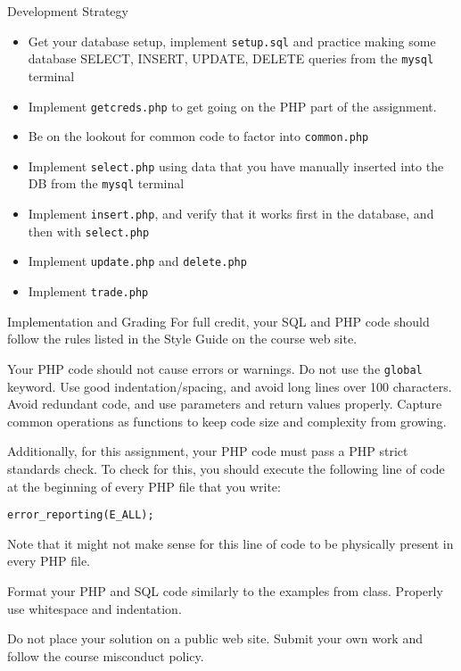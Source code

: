 \documentclass[programming]{../../../../mfcs}
\begin{document}
\begin{question}{Development Strategy}
     \begin{itemize}
       \item Get your database setup, implement \texttt{setup.sql} and practice making some database SELECT, INSERT, UPDATE, DELETE queries from the \texttt{mysql} terminal
       \item Implement \texttt{getcreds.php} to get going on the PHP part of the assignment.
       \item Be on the lookout for common code to factor into \texttt{common.php}
       \item Implement \texttt{select.php} using data that you have manually inserted into the DB from the \texttt{mysql} terminal
       \item Implement \texttt{insert.php}, and verify that it works first in the database, and then with \texttt{select.php}
       \item Implement \texttt{update.php} and \texttt{delete.php}
       \item Implement \texttt{trade.php}
     \end{itemize}
\end{question}


\begin{question}{Implementation and Grading}
For full credit, your SQL and PHP code should follow the rules listed in the Style Guide on the course web site.
\newline

Your PHP code should not cause errors or warnings. Do not use the \texttt{global} keyword. Use good indentation/spacing,
and avoid long lines over 100 characters. Avoid redundant code, and use parameters and return values properly.
Capture common operations as functions to keep code size and complexity from growing.
\newline

Additionally, for this assignment, your PHP code must pass a PHP strict standards check. To check for this, you
should execute the following line of code at the beginning of every PHP file that you write:
  \begin{verbatim}
error_reporting(E_ALL); \end{verbatim}

Note that it might not make sense for this line of code to be physically present in every PHP file.
\newline

Format your PHP and SQL code similarly to the examples from class. Properly use whitespace and indentation.
\newline

Do not place your solution on a public web site. Submit your own work and follow the course misconduct policy.
\end{question}
\end{document}
